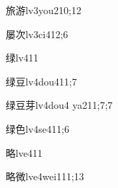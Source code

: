 \begin{verbete}{旅游}{lv3you2}{10;12}
\end{verbete}

\begin{verbete}{屡次}{lv3ci4}{12;6}
\end{verbete}

\begin{verbete}{绿}{lv4}{11}
\end{verbete}

\begin{verbete}{绿豆}{lv4dou4}{11;7}
\end{verbete}

\begin{verbete}{绿豆芽}{lv4dou4 ya2}{11;7;7}
\end{verbete}

\begin{verbete}{绿色}{lv4se4}{11;6}
\end{verbete}

\begin{verbete}{略}{lve4}{11}
\end{verbete}

\begin{verbete}{略微}{lve4wei1}{11;13}
\end{verbete}

